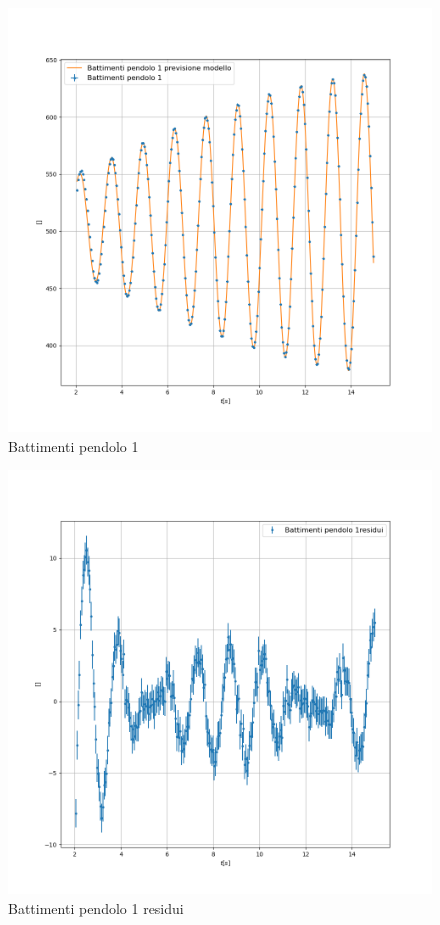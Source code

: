\documentclass{article}
\begin{document}
                    \begin{figure}
                        \centering
                        \includegraphics[width=1\linewidth]{Battimenti pendolo 1.png}
                        \caption{Battimenti pendolo 1}
                        \label{fig:pb}
                    \end{figure}
        
        
                    \begin{figure}
                        \centering
                        \includegraphics[width=1\linewidth]{Battimenti pendolo 1_residuals.png}
                        \caption{Battimenti pendolo 1 residui}
                        \label{fig:pbres}
                    \end{figure}
\end{document}

